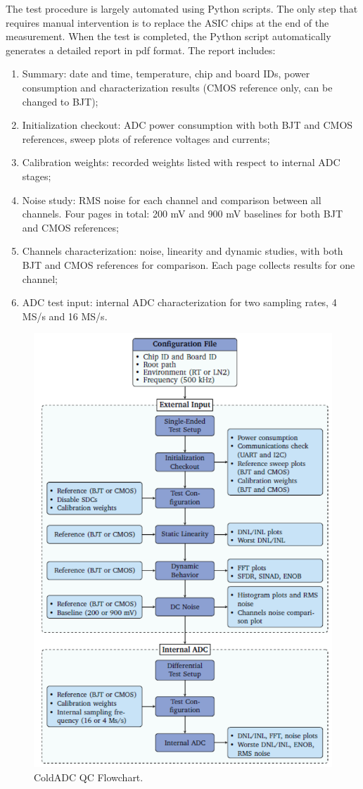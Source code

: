The test procedure is largely automated using Python scripts. The only step that requires manual intervention is to replace the ASIC chips 
at the end of the measurement. When the test is completed, the Python script automatically generates a detailed report in pdf format. 
The report includes:
\begin{enumerate}
\item Summary: date and time, temperature, chip and board IDs, power consumption and characterization results (CMOS reference only, can be changed to BJT);
\item Initialization checkout: ADC power consumption with both BJT and CMOS references, sweep plots of reference voltages and currents;
\item Calibration weights: recorded weights listed with respect to internal ADC stages;
\item Noise study: RMS noise for each channel and comparison between all channels. Four pages in total: 200 mV and 900 mV baselines for both BJT and CMOS references;
\item Channels characterization: noise, linearity and dynamic studies, with both BJT and CMOS references for comparison. Each page collects results for one channel;
\item ADC test input: internal ADC characterization for two sampling rates, 4 MS/s and 16 MS/s.
\end{enumerate}
\begin{figure}[h!]
\centering
  \includegraphics[width=0.8\linewidth]{figures/QC_flowchart.png}
  \caption{ColdADC QC Flowchart.}
  \label{fig:qc_flowchart}
\end{figure}

